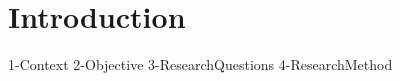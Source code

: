 \chapter{Introduction}
    \ifpdf
        \graphicspath{{2-MainMatter/1_introduction/figures/PNG/}{2-MainMatter/1_introduction/figures/PDF/}{2-MainMatter/1_introduction/figures/}}
    \else
        \graphicspath{{2-MainMatter/1_introduction/figures/EPS/}{2-MainMatter/1_introduction/figures/}}
    \fi

    {1-Context}
    {2-Objective}
    {3-ResearchQuestions}
    {4-ResearchMethod}